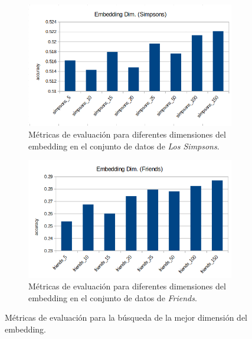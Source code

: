 \begin{figure}[H]
    \centering
    \begin{subfigure}[b]{0.45\textwidth}
        \centering
        \includegraphics[width=\textwidth]{doc/images/em_models/embedding_dim_simpsons.png}
        \caption{Métricas de evaluación para diferentes dimensiones del embedding en el conjunto de datos de \textit{Los Simpsons}.}
        \label{fig:em_embedding_simpsons}
    \end{subfigure}
    \hfill
    \begin{subfigure}[b]{0.45\textwidth}
        \centering
        \includegraphics[width=\textwidth]{doc/images/em_models/embedding_dim_friends.png}
        \caption{Métricas de evaluación para diferentes dimensiones del embedding en el conjunto de datos de \textit{Friends}.}
        \label{fig:em_embedding_friends}
    \end{subfigure}
    \caption{Métricas de evaluación para la búsqueda de la mejor dimensión del embedding.}
    \label{fig:em_embedding}
\end{figure}

